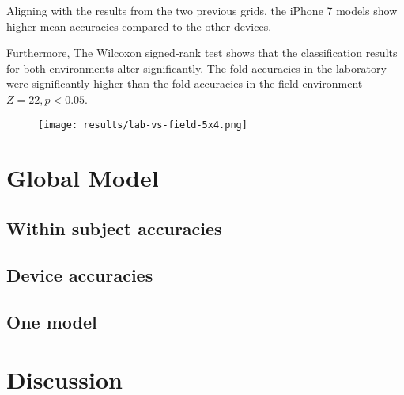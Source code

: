 Aligning with the results from the two previous grids, the iPhone 7 models show higher mean accuracies compared to the other devices. 

Furthermore, The Wilcoxon signed-rank test shows that the classification results for both environments alter significantly. The fold accuracies in the laboratory were significantly higher than the fold accuracies in the field environment $Z = 22, p < 0.05$.

\begin{figure}[h!]
  \centering
  \texttt{[image: results/lab-vs-field-5x4.png]}
  \caption{} \label{fig:participation}
\end{figure}


\section{Global Model}
\subsection{Within subject accuracies}
\subsection{Device accuracies}
\subsection{One model}

\section{Discussion}
